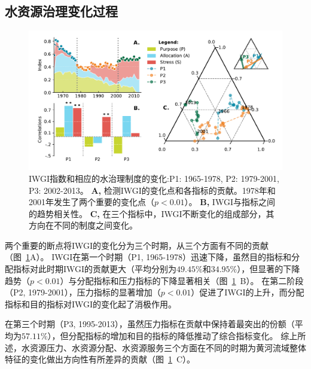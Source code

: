 \subsection{水资源治理变化过程}
\label{Res.1}

\begin{figure}[ht!]
	\centering
	\includegraphics[width=\textwidth]{img/ch4/index.pdf}
	\caption{IWGI指数和相应的水治理制度的变化:P1: 1965-1978, P2: 1979-2001, P3: 2002-2013。
	\textbf{A,} 检测IWGI的变化点和各指标的贡献。1978年和2001年发生了两个重要的变化点（$p<0.01$）。
	\textbf{B,}  IWGI与指标之间的趋势相关性。
	\textbf{C,} 在三个指标中，IWGI不断变化的组成部分，其方向在不同的制度之间变化。
	}
	\label{ch4:fig:IWGI}
\end{figure}

两个重要的断点将IWGI的变化分为三个时期，从三个方面有不同的贡献（图~\ref{ch4:fig:IWGI}A）。
IWGI在第一个时期（P1, 1965-1978）迅速下降，虽然目的指标和分配指标对此时期IWGI的贡献更大（平均分别为$49.45\%$和$34.95\%$），但显著的下降趋势（$p<0.01$）与分配指标和压力指标的下降显著相关（图~\ref{ch4:fig:IWGI}~B）。
在第二阶段（P2, 1979-2001），压力指标的显著增加（$p<0.01$）促进了IWGI的上升，而分配指标和目的指标对IWGI的变化起了消极作用。

在第三个时期（P3, 1995-2013），虽然压力指标在贡献中保持着最突出的份额（平均为$57.11\%$），但分配指标的增加和目的指标的降低推动了综合指标变化。
综上所述，水资源压力、水资源分配、水资源服务三个方面在不同的时期为黄河流域整体特征的变化做出方向性有所差异的贡献（图~\ref{ch4:fig:IWGI}~C）。
